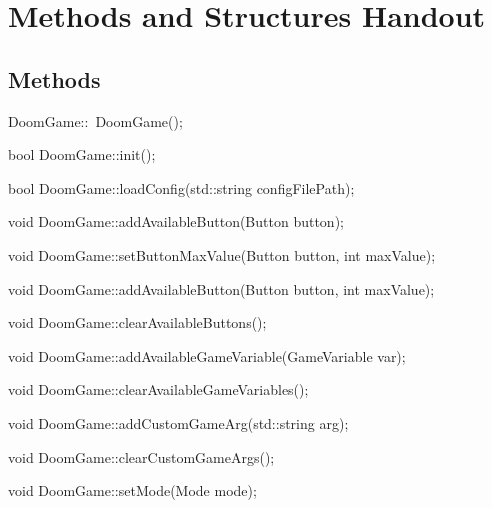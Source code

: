 \chapter{Methods and Structures Handout}
\section{Methods}


\begin{clinee}
DoomGame::~DoomGame();
\end{clinee}


\begin{clinee}
bool DoomGame::init();
\end{clinee}


\begin{clinee}
bool DoomGame::loadConfig(std::string configFilePath);
\end{clinee}


\begin{clinee}
void DoomGame::addAvailableButton(Button button);
\end{clinee}

\begin{clinee}
void DoomGame::setButtonMaxValue(Button button, int maxValue);
\end{clinee}


\begin{clinee}
void DoomGame::addAvailableButton(Button button, int maxValue);
\end{clinee}


\begin{clinee}
void DoomGame::clearAvailableButtons();
\end{clinee}


\begin{clinee}
void DoomGame::addAvailableGameVariable(GameVariable var);
\end{clinee}


\begin{clinee}
void DoomGame::clearAvailableGameVariables();
\end{clinee}
	

\begin{clinee}
void DoomGame::addCustomGameArg(std::string arg);
\end{clinee}


\begin{clinee}
void DoomGame::clearCustomGameArgs();
\end{clinee}


\begin{clinee}
void DoomGame::setMode(Mode mode);
\end{clinee}
	

